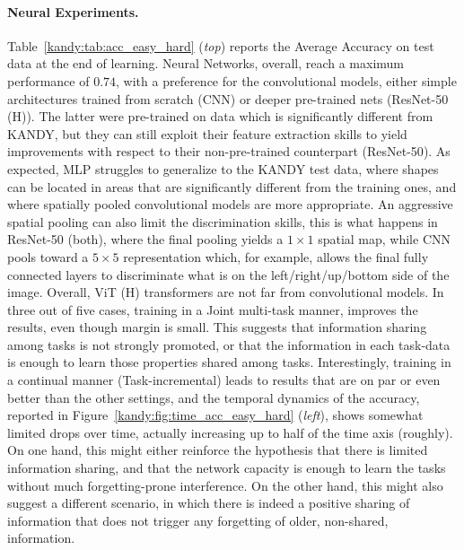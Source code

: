 \paragraph{Neural Experiments.}
Table~\ref{kandy:tab:acc_easy_hard} ({\it top}) reports the {\sc\small Average Accuracy} on test data at the end of learning. Neural Networks, overall, reach a maximum performance of $0.74$, with a preference for the convolutional models, either simple architectures trained from scratch ({\small\sc CNN}) or deeper pre-trained nets ({\small\sc ResNet-50 (H)}). The latter were pre-trained on data which is significantly different from \textsc{KANDY}, but they can still exploit their feature extraction skills to yield improvements with respect to their non-pre-trained counterpart ({\small\sc ResNet-50}). As expected, {\sc\small MLP} struggles to generalize to the \textsc{KANDY} test data, where shapes can be located in areas that are significantly different from the training ones, and where spatially pooled convolutional models are more appropriate. An aggressive spatial pooling can also limit the discrimination skills, this is what happens in {\sc\small ResNet-50} (both), where the final pooling yields a $1\times 1$ spatial map, while {\sc\small CNN} pools toward a $5\times 5$ representation which, for example, allows the final fully connected layers to discriminate what is on the left/right/up/bottom side of the image. Overall, {\sc\small ViT (H)} transformers are not far from convolutional models. 
In three out of five cases, training in a {\sc\small Joint} multi-task manner, improves the results, even though margin is small. This suggests that information sharing among tasks is not strongly promoted, or that the information in each task-data is enough to learn those properties shared among tasks. 
Interestingly, training in a continual manner ({\sc\small Task-incremental}) leads to results that are on par or even better than the other settings, and the temporal dynamics of the accuracy, reported in Figure~\ref{kandy:fig:time_acc_easy_hard} ({\it left}), shows somewhat limited drops over time, actually increasing up to half of the time axis (roughly). On one hand, this might either reinforce the hypothesis that there is limited information sharing, and that the network capacity is enough to learn the tasks without much forgetting-prone interference. On the other hand, this might also suggest a different scenario, in which there is indeed a positive sharing of information that does not trigger any forgetting of older, non-shared, information. 
